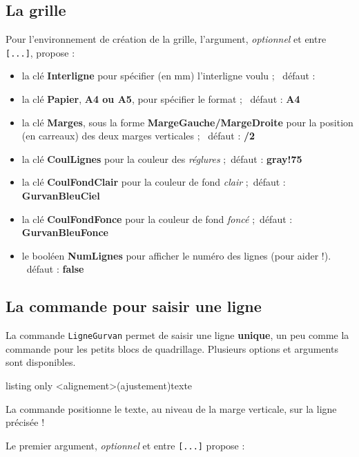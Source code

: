 \documentclass[a4paper]{article}
\newcommand\Cle[1]{{\bfseries\sffamily\textlangle #1\textrangle}}
\begin{document}
\subsection{La grille}

Pour l'environnement de création de la grille, l'argument, \textit{optionnel} et entre \texttt{[...]}, propose :

\begin{itemize}
	\item la clé \Cle{Interligne} pour spécifier (en mm) l'interligne voulu ; \hfill~défaut : \Cle{3}
	\item la clé \Cle{Papier}, \Cle{A4 ou A5}, pour spécifier le format ; \hfill~défaut : \Cle{A4}
	\item la clé \Cle{Marges}, sous la forme \Cle{MargeGauche/MargeDroite} pour la position (en carreaux) des deux marges verticales ; \hfill~défaut : \Cle{5/2}
	\item la clé \Cle{CoulLignes} pour la couleur des \textit{réglures} ;\hfill~défaut : \Cle{gray!75}
	\item la clé \Cle{CoulFondClair} pour la couleur de fond \textit{clair} ;\hfill~défaut : \Cle{GurvanBleuCiel}
	\item la clé \Cle{CoulFondFonce} pour la couleur de fond \textit{foncé} ;\hfill~défaut : \Cle{GurvanBleuFonce}
	
	\item le booléen \Cle{NumLignes} pour afficher le numéro des lignes (pour aider !). \hfill~défaut : \Cle{false}
\end{itemize}

\subsection{La commande pour saisir une ligne}

La commande \texttt{LigneGurvan} permet de saisir une ligne \textbf{unique}, un peu comme la commande pour les petits blocs de quadrillage. Plusieurs options et arguments sont disponibles.

\begin{PresentationCode}{listing only}
\LigneGurvan[options]<alignement>(ajustement){texte}
\end{PresentationCode}

La commande positionne le \textsf{texte}, au niveau de la marge verticale, sur la ligne précisée !

\smallskip

Le premier argument, \textit{optionnel} et entre \texttt{[...]} propose :
\end{document}
